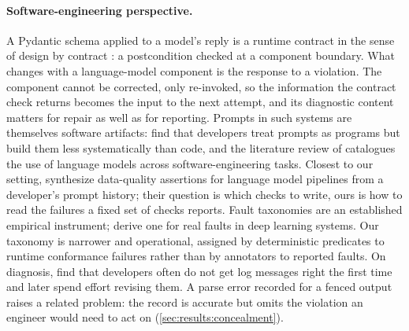 \paragraph{Software-engineering perspective.}
A Pydantic schema applied to a model's reply is a runtime contract in the
sense of design by contract \citep{meyer1992contract}: a postcondition
checked at a component boundary. What changes with a language-model
component is the response to a violation. The component cannot be
corrected, only re-invoked, so the information the contract check
returns becomes the input to the next attempt, and its diagnostic
content matters for repair as well as for reporting. Prompts in such
systems are themselves software artifacts: \citet{liang2025prompts} find
that developers treat prompts as programs but build them less
systematically than code, and the literature review of
\citet{hou2024llm4se} catalogues the use of language models across
software-engineering tasks. Closest to our setting,
\citet{shankar2024spade} synthesize data-quality assertions for language
model pipelines from a developer's prompt history; their question is
which checks to write, ours is how to read the failures a fixed set of
checks reports. Fault taxonomies are an established empirical
instrument; \citet{humbatova2020taxonomy} derive one for real faults in
deep learning systems. Our taxonomy is
narrower and operational, assigned by deterministic predicates to runtime
conformance failures rather than by annotators to reported faults. On
diagnosis, \citet{yuan2012logging} find that developers often do not get
log messages right the first time and later spend effort revising them.
A parse error recorded for a fenced output raises a related problem: the
record is accurate but omits the violation an engineer would need to act
on
(\cref{sec:results:concealment}).

